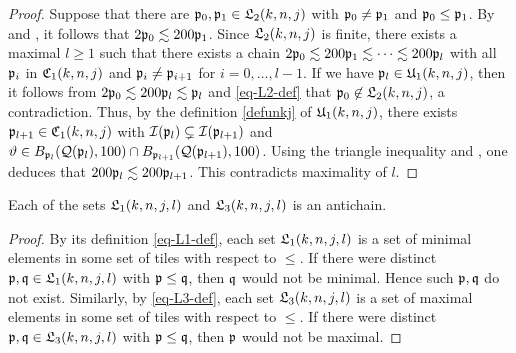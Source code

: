 \begin{proof}
    \leanok
    Suppose that there are ${\mathfrak p}_0, {\mathfrak p}_1 \in {\mathfrak L}_2(k,n,j)$ with ${\mathfrak p}_0 \ne {\mathfrak p}_1$ and ${\mathfrak p}_0 \le {\mathfrak p}_1$. By  and , it follows that $2{\mathfrak p}_0 \lesssim 200{\mathfrak p}_1$. Since ${\mathfrak L}_2(k,n,j)$ is finite, there exists a maximal $l \ge 1$ such that there exists a chain $2{\mathfrak p}_0 \lesssim 200 {\mathfrak p}_1 \lesssim \dotsb \lesssim 200 {\mathfrak p}_l$ with all ${\mathfrak p}_i$ in ${\mathfrak C}_1(k,n,j)$ and ${\mathfrak p}_i \ne {\mathfrak p}_{i+1}$ for $i = 0, \dotsc, l-1$.
    If we have ${\mathfrak p}_l \in {\mathfrak U}_1(k,n,j)$, then it follows from $2{\mathfrak p}_0 \lesssim 200 {\mathfrak p}_l \lesssim {\mathfrak p}_l$ and \eqref{eq-L2-def} that ${\mathfrak p}_0 \not\in {\mathfrak L}_2(k,n,j)$, a contradiction. Thus, by the definition \eqref{defunkj} of ${\mathfrak U}_1(k,n,j)$, there exists ${\mathfrak p}_{l+1} \in {\mathfrak C}_1(k,n,j)$ with ${\mathcal{I}}({\mathfrak p}_l) \subsetneq {\mathcal{I}}({\mathfrak p}_{l+1}) $ and ${\vartheta} \in B_{{\mathfrak p}_l}({\mathcal{Q}}({\mathfrak p}_l), 100) \cap B_{{\mathfrak p}_{l+1}}({\mathcal{Q}}({\mathfrak p}_{l+1}), 100)$. Using the triangle inequality and , one deduces that $200 {\mathfrak p}_l \lesssim 200{\mathfrak p}_{l+1}$. This contradicts maximality of $l$.
\end{proof}

\begin{lemma}[L1 L3 antichain]
\label{L1-L3-antichain}
\leanok
{}
    Each of the sets ${\mathfrak L}_1(k,n,j,l)$ and ${\mathfrak L}_3(k,n,j,l)$ is an antichain.
\end{lemma}

\begin{proof}
    \leanok
    By its definition \eqref{eq-L1-def}, each set ${\mathfrak L}_1(k,n,j,l)$ is a set of minimal elements in some set of tiles with respect to $\le$. If there were distinct ${\mathfrak p}, {\mathfrak q} \in {\mathfrak L}_1(k,n,j,l)$ with ${\mathfrak p} \le {\mathfrak q}$, then ${\mathfrak q}$ would not be minimal. Hence such ${\mathfrak p}, {\mathfrak q}$ do not exist. Similarly, by \eqref{eq-L3-def}, each set ${\mathfrak L}_3(k,n,j,l)$ is a set of maximal elements in some set of tiles with respect to $\le$. If there were distinct ${\mathfrak p}, {\mathfrak q} \in {\mathfrak L}_3(k,n,j,l)$ with ${\mathfrak p} \le {\mathfrak q}$, then ${\mathfrak p}$ would not be maximal.
\end{proof}

